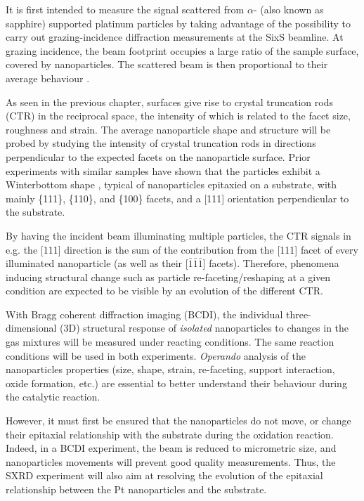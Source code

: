 It is first intended to measure the signal scattered from $\alpha$- (also known as sapphire) supported platinum particles by taking advantage of the possibility to carry out grazing-incidence diffraction measurements at the SixS beamline.
At grazing incidence, the beam footprint occupies a large ratio of the sample surface, covered by nanoparticles.
The scattered beam is then proportional to their average behaviour \parencite{Nolte2008, Hejral2013, Hejral2016}.

As seen in the previous chapter, surfaces give rise to crystal truncation rods (CTR) in the reciprocal space, the intensity of which is related to the facet size, roughness and strain.
The average nanoparticle shape and structure will be probed by studying the intensity of crystal truncation rods in directions perpendicular to the expected facets on the nanoparticle surface.
Prior experiments with similar samples \parencite{Dupraz2017, Li2020, Lim2021, Dupraz2022} have shown that the particles exhibit a Winterbottom shape \parencite{Winterbottom1967, Boukouvala2021}, typical of nanoparticles epitaxied on a substrate, with mainly \{111\}, \{110\}, and \{100\} facets, and a [111] orientation perpendicular to the substrate.

By having the incident beam illuminating multiple particles, the CTR signals in e.g. the [111] direction is the sum of the contribution from the [111] facet of every illuminated nanoparticle (as well as their [$\bar{1}\bar{1}\bar{1}$] facets).
Therefore, phenomena inducing structural change such as particle re-faceting/reshaping at a given condition are expected to be visible by an evolution of the different CTR.

With Bragg coherent diffraction imaging (BCDI), the individual three-dimensional (3D) structural response of \textit{isolated} nanoparticles to changes in the gas mixtures will be measured under reacting conditions.
The same reaction conditions will be used in both experiments.
\textit{Operando} analysis of the nanoparticles properties (size, shape, strain, re-faceting, support interaction, oxide formation, etc.) are essential to better understand their behaviour during the catalytic reaction.

However, it must first be ensured that the nanoparticles do not move, or change their epitaxial relationship with the substrate during the oxidation reaction.
Indeed, in a BCDI experiment, the beam is reduced to micrometric size, and nanoparticles movements will prevent good quality measurements.
Thus, the SXRD experiment will also aim at resolving the evolution of the epitaxial relationship between the Pt nanoparticles and the  substrate.

